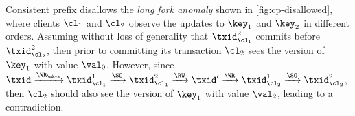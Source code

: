Consistent prefix disallows the \emph{long fork anomaly} shown in \cref{fig:cp-disallowed}, where clients $\cl_1$ and $\cl_2$ observe the updates to $\key_1$ and $\key_2$ 
in different orders. 
Assuming without loss of generality that \( \txid_{\cl_1}^{2} \) commits 
before \( \txid_{\cl_2}^{2} \), then prior to committing its transaction $\cl_2$ sees 
the version of $\key_1$ with value $\val_0$. 
However, since $\txid \xrightarrow{\WR_{\mkvs}} \txid_{\cl_{1}}^{1} 
\xrightarrow{\SO} \txid_{\cl_{1}}^{2} \xrightarrow{\RW} \txid' \xrightarrow{\WR} \txid_{\cl_{2}}^{1} \xrightarrow{\SO} 
\txid_{\cl_2}^{2}$, then $\cl_2$ should also see the version of $\key_1$ with 
value $\val_2$, leading to a contradiction.


